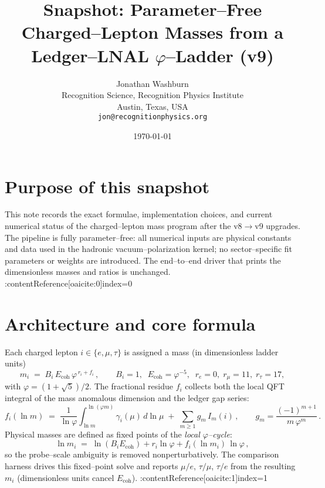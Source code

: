 \documentclass[12pt]{article}
\title{Snapshot: Parameter--Free Charged--Lepton Masses from a Ledger--LNAL $\varphi$--Ladder (v9)}
\author{Jonathan Washburn\\Recognition Science, Recognition Physics Institute\\Austin, Texas, USA\\\texttt{jon@recognitionphysics.org}}
\date{\today}
\begin{document}
\maketitle
\section*{Purpose of this snapshot}
This note records the exact formulae, implementation choices, and current numerical status of the charged--lepton mass program after the v8$\to$v9 upgrades. The pipeline is fully parameter--free: all numerical inputs are physical constants and data used in the hadronic vacuum--polarization kernel; no sector--specific fit parameters or weights are introduced. The end--to--end driver that prints the dimensionless masses and ratios is unchanged. :contentReference[oaicite:0]{index=0}
\section*{Architecture and core formula}
Each charged lepton $i\in\{e,\mu,\tau\}$ is assigned a mass (in dimensionless ladder units)
\[m_i \;=\; B_i\,E_{\mathrm{coh}}\,\varphi^{\,r_i + f_i}\,,\qquad B_i=1,\;\; E_{\mathrm{coh}}=\varphi^{-5},\;\; r_e=0,\; r_\mu=11,\; r_\tau=17,\]
with $\varphi=(1+\sqrt5)/2$. The fractional residue $f_i$ collects both the local QFT integral of the mass anomalous dimension and the ledger gap series:
\[f_i(\ln m)\;=\;\frac{1}{\ln\varphi}\int_{\ln m}^{\ln(\varphi m)}\gamma_i(\mu)\,d\ln\mu\;+\;\sum_{m\ge1} g_m\,I_m(i)\,,\qquad g_m=\frac{(-1)^{m+1}}{m\,\varphi^m}\,.
\]
Physical masses are defined as fixed points of the \emph{local $\varphi$--cycle}:
\[\ln m_i \;=\; \ln(B_iE_{\mathrm{coh}})+r_i\ln\varphi + f_i(\ln m_i)\,\ln\varphi\,,\]
so the probe--scale ambiguity is removed nonperturbatively. The comparison harness drives this fixed--point solve and reports $\mu/e$, $\tau/\mu$, $\tau/e$ from the resulting $m_i$ (dimensionless units cancel $E_{\mathrm{coh}}$). :contentReference[oaicite:1]{index=1}
\end{document}
